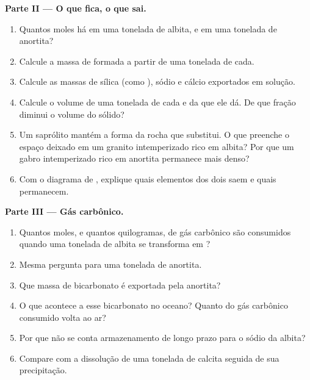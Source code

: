 \begin{problem}
\medskip
\noindent\textbf{Parte II --- O que fica, o que sai.}
\begin{enumerate}[resume]
  \item Quantos moles há em uma tonelada de albita, e em uma tonelada de
        anortita?
  \item Calcule a massa de  formada a partir de uma tonelada de cada.
  \item Calcule as massas de sílica (como ), sódio e cálcio exportados em solução.
  \item Calcule o volume de uma tonelada de cada  e da  que ele dá. De que fração diminui o volume do sólido?
  \item Um saprólito mantém a forma da rocha que substitui. O que preenche o espaço deixado em um granito intemperizado rico em albita? Por que um gabro intemperizado rico em anortita permanece mais denso?
  \item Com o diagrama de , explique quais elementos dos dois  saem e quais permanecem.
\end{enumerate}

\medskip
\noindent\textbf{Parte III --- Gás carbônico.}
\begin{enumerate}[resume]
  \item Quantos moles, e quantos quilogramas, de gás carbônico são consumidos quando uma tonelada de albita se transforma em ?
  \item Mesma pergunta para uma tonelada de anortita.
  \item Que massa de bicarbonato é exportada pela anortita?
  \item O que acontece a esse bicarbonato no oceano? Quanto do gás carbônico consumido volta ao ar?
  \item Por que não se conta armazenamento de longo prazo para o sódio da albita?
  \item Compare com a dissolução de uma tonelada de calcita seguida de sua precipitação.
\end{enumerate}


\end{problem}

